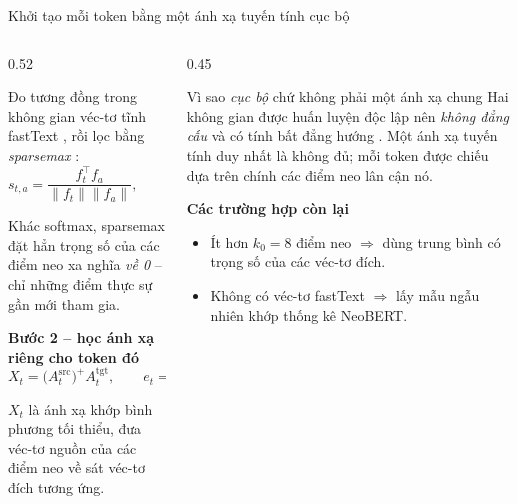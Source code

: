\begin{frame}{Khởi tạo mỗi token bằng một ánh xạ tuyến tính cục bộ}
\vspace{0.3em}
\begin{columns}[T]
\begin{column}{0.52\textwidth}

  Đo tương đồng trong không gian véc-tơ tĩnh fastText ,
  rồi lọc bằng \emph{sparsemax} :
  \vspace{-4pt}
  \[ s_{t,a}=\frac{f_t^{\top}f_a}{\|f_t\|\|f_a\|},\qquad
     w_t=\mathrm{sparsemax}(s_t) \]
  \vspace{-8pt}

  {\footnotesize Khác softmax, sparsemax đặt hẳn trọng số của các điểm neo
  xa nghĩa \emph{về 0} -- chỉ những điểm thực sự gần mới tham gia.}

  \vspace{0.5em}
  \textbf{Bước 2 -- học ánh xạ riêng cho token đó}
  \vspace{-4pt}
  \[ X_t=\bigl(A^{\mathrm{src}}_t\bigr)^{+}A^{\mathrm{tgt}}_t,
     \qquad e_t=d_t X_t \]
  \vspace{-8pt}

  {\footnotesize $X_t$ là ánh xạ khớp bình phương tối thiểu, đưa véc-tơ nguồn
  của các điểm neo về sát véc-tơ đích tương ứng.}
\end{column}

\begin{column}{0.45\textwidth}
  \begin{block}{Vì sao \emph{cục bộ} chứ không phải một ánh xạ chung}
    \small Hai không gian được huấn luyện độc lập nên \emph{không đẳng cấu}
     và có tính bất đẳng hướng .
    Một ánh xạ tuyến tính duy nhất là không đủ; mỗi token
    được chiếu dựa trên chính các điểm neo lân cận nó.
  \end{block}

  \vspace{0.4em}
  \textbf{Các trường hợp còn lại}
  \begin{itemize}\itemsep1pt
    \item Ít hơn $k_0=8$ điểm neo $\Rightarrow$ dùng trung bình có trọng số
          của các véc-tơ đích.
    \item Không có véc-tơ fastText $\Rightarrow$ lấy mẫu ngẫu nhiên khớp
          thống kê NeoBERT.
  \end{itemize}
\end{column}
\end{columns}
\end{frame}

